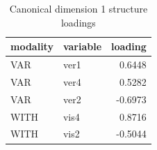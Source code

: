 \begin{table}
\caption{Canonical dimension 1 structure loadings}
\label{tab:cca_dimension_1_loadings}
\begin{tabular}{llr}
\toprule
modality & variable & loading \\
\midrule
VAR & ver1 & 0.6448 \\
VAR & ver4 & 0.5282 \\
VAR & ver2 & -0.6973 \\
WITH & vis4 & 0.8716 \\
WITH & vis2 & -0.5044 \\
\bottomrule
\end{tabular}
\end{table}
